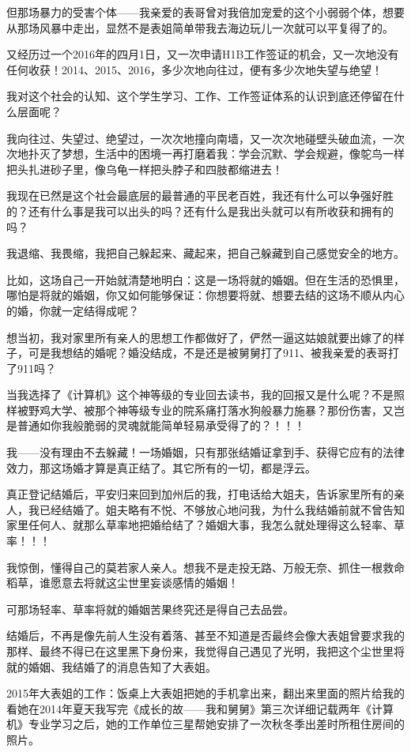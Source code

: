 \documentclass[9pt, b5paper]{article}
\begin{document}
但那场暴力的受害个体——我亲爱的表哥曾对我倍加宠爱的这个小弱弱个体，想要从那场风暴中走出，显然不是表姐简单带我去海边玩儿一次就可以平复得了的。

又经历过一个2016年的四月1日，又一次申请H1B工作签证的机会，又一次地没有任何收获！2014、2015、2016，多少次地向往过，便有多少次地失望与绝望！

我对这个社会的认知、这个学生学习、工作、工作签证体系的认识到底还停留在什么层面呢？

我向往过、失望过、绝望过，一次次地撞向南墙，又一次次地碰壁头破血流，一次次地扑灭了梦想，生活中的困境一再打磨着我：学会沉默、学会规避，像鸵鸟一样把头扎进砂子里，像乌龟一样把头脖子和四肢都缩进去！

我现在已然是这个社会最底层的最普通的平民老百姓，我还有什么可以争强好胜的？还有什么事是我可以出头的吗？还有什么是我出头就可以有所收获和拥有的吗？

我退缩、我畏缩，我把自己躲起来、藏起来，把自己躲藏到自己感觉安全的地方。

比如，这场自己一开始就清楚地明白：这是一场将就的婚姻。但在生活的恐惧里，哪怕是将就的婚姻，你又如何能够保证：你想要将就、想要去结的这场不顺从内心的婚，你就一定结得成呢？

想当初，我对家里所有亲人的思想工作都做好了，俨然一逼这姑娘就要出嫁了的样子，可是我想结的婚呢？婚没结成，不是还是被舅舅打了911、被我亲爱的表哥打了911吗？

当我选择了《计算机》这个神等级的专业回去读书，我的回报又是什么呢？不是照样被野鸡大学、被那个神等级专业的院系痛打落水狗般暴力施暴？那份伤害，又岂是普通如你我般脆弱的灵魂就能简单轻易承受得了的？！！！

我——没有理由不去躲藏！一场婚姻，只有那张结婚证拿到手、获得它应有的法律效力，那这场婚才算是真正结了。其它所有的一切，都是浮云。

真正登记结婚后，平安归来回到加州后的我，打电话给大姐夫，告诉家里所有的亲人，我已经结婚了。姐夫略有不悦、不够放心地问我，为什么我结婚前就不曾告知家里任何人、就那么草率地把婚给结了？婚姻大事，我怎么就处理得这么轻率、草率！！！

我惊倒，懂得自己的莫若家人亲人。想我不是走投无路、万般无奈、抓住一根救命稻草，谁愿意去将就这尘世里妄谈感情的婚姻！

可那场轻率、草率将就的婚姻苦果终究还是得自己去品尝。

结婚后，不再是像先前人生没有着落、甚至不知道是否最终会像大表姐曾要求我的那样、最终不得已在这里黑下身份来，我觉得自己遇见了光明，我把这个尘世里将就的婚姻、我结婚了的消息告知了大表姐。

2015年大表姐的工作：饭桌上大表姐把她的手机拿出来，翻出来里面的照片给我的看她在2014年夏天我写完《成长的故——我和舅舅》第三次详细记载两年《计算机》专业学习之后，她的工作单位三星帮她安排了一次秋冬季出差时所租住房间的照片。
\end{document}
